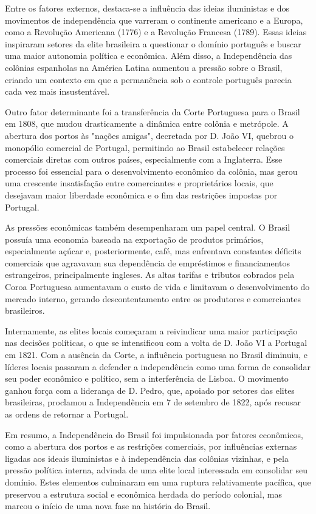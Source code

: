 \documentclass[a4paper,12pt]{article}[abntex2]
\begin{document}
Entre os fatores externos, destaca-se a influência das ideias iluministas e dos movimentos de independência que varreram o continente americano e a Europa, como a Revolução Americana (1776) e a Revolução Francesa (1789). Essas ideias inspiraram setores da elite brasileira a questionar o domínio português e buscar uma maior autonomia política e econômica. Além disso, a Independência das colônias espanholas na América Latina aumentou a pressão sobre o Brasil, criando um contexto em que a permanência sob o controle português parecia cada vez mais insustentável.

Outro fator determinante foi a transferência da Corte Portuguesa para o Brasil em 1808, que mudou drasticamente a dinâmica entre colônia e metrópole. A abertura dos portos às "nações amigas", decretada por D. João VI, quebrou o monopólio comercial de Portugal, permitindo ao Brasil estabelecer relações comerciais diretas com outros países, especialmente com a Inglaterra. Esse processo foi essencial para o desenvolvimento econômico da colônia, mas gerou uma crescente insatisfação entre comerciantes e proprietários locais, que desejavam maior liberdade econômica e o fim das restrições impostas por Portugal.

As pressões econômicas também desempenharam um papel central. O Brasil possuía uma economia baseada na exportação de produtos primários, especialmente açúcar e, posteriormente, café, mas enfrentava constantes déficits comerciais que agravavam sua dependência de empréstimos e financiamentos estrangeiros, principalmente ingleses. As altas tarifas e tributos cobrados pela Coroa Portuguesa aumentavam o custo de vida e limitavam o desenvolvimento do mercado interno, gerando descontentamento entre os produtores e comerciantes brasileiros.

Internamente, as elites locais começaram a reivindicar uma maior participação nas decisões políticas, o que se intensificou com a volta de D. João VI a Portugal em 1821. Com a ausência da Corte, a influência portuguesa no Brasil diminuiu, e líderes locais passaram a defender a independência como uma forma de consolidar seu poder econômico e político, sem a interferência de Lisboa. O movimento ganhou força com a liderança de D. Pedro, que, apoiado por setores das elites brasileiras, proclamou a Independência em 7 de setembro de 1822, após recusar as ordens de retornar a Portugal.

Em resumo, a Independência do Brasil foi impulsionada por fatores econômicos, como a abertura dos portos e as restrições comerciais, por influências externas ligadas aos ideais iluministas e à independência das colônias vizinhas, e pela pressão política interna, advinda de uma elite local interessada em consolidar seu domínio. Estes elementos culminaram em uma ruptura relativamente pacífica, que preservou a estrutura social e econômica herdada do período colonial, mas marcou o início de uma nova fase na história do Brasil.
\end{document}
